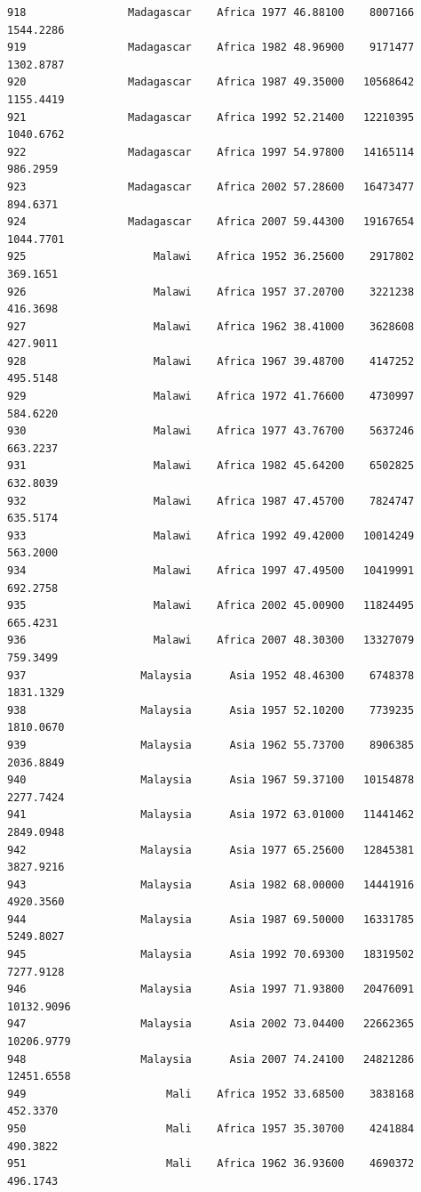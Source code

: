 \documentclass[
  letterpaper,
  DIV=11,
  numbers=noendperiod]{scrreprt}
\begin{document}
\begin{verbatim}
918                Madagascar    Africa 1977 46.88100    8007166   1544.2286
919                Madagascar    Africa 1982 48.96900    9171477   1302.8787
920                Madagascar    Africa 1987 49.35000   10568642   1155.4419
921                Madagascar    Africa 1992 52.21400   12210395   1040.6762
922                Madagascar    Africa 1997 54.97800   14165114    986.2959
923                Madagascar    Africa 2002 57.28600   16473477    894.6371
924                Madagascar    Africa 2007 59.44300   19167654   1044.7701
925                    Malawi    Africa 1952 36.25600    2917802    369.1651
926                    Malawi    Africa 1957 37.20700    3221238    416.3698
927                    Malawi    Africa 1962 38.41000    3628608    427.9011
928                    Malawi    Africa 1967 39.48700    4147252    495.5148
929                    Malawi    Africa 1972 41.76600    4730997    584.6220
930                    Malawi    Africa 1977 43.76700    5637246    663.2237
931                    Malawi    Africa 1982 45.64200    6502825    632.8039
932                    Malawi    Africa 1987 47.45700    7824747    635.5174
933                    Malawi    Africa 1992 49.42000   10014249    563.2000
934                    Malawi    Africa 1997 47.49500   10419991    692.2758
935                    Malawi    Africa 2002 45.00900   11824495    665.4231
936                    Malawi    Africa 2007 48.30300   13327079    759.3499
937                  Malaysia      Asia 1952 48.46300    6748378   1831.1329
938                  Malaysia      Asia 1957 52.10200    7739235   1810.0670
939                  Malaysia      Asia 1962 55.73700    8906385   2036.8849
940                  Malaysia      Asia 1967 59.37100   10154878   2277.7424
941                  Malaysia      Asia 1972 63.01000   11441462   2849.0948
942                  Malaysia      Asia 1977 65.25600   12845381   3827.9216
943                  Malaysia      Asia 1982 68.00000   14441916   4920.3560
944                  Malaysia      Asia 1987 69.50000   16331785   5249.8027
945                  Malaysia      Asia 1992 70.69300   18319502   7277.9128
946                  Malaysia      Asia 1997 71.93800   20476091  10132.9096
947                  Malaysia      Asia 2002 73.04400   22662365  10206.9779
948                  Malaysia      Asia 2007 74.24100   24821286  12451.6558
949                      Mali    Africa 1952 33.68500    3838168    452.3370
950                      Mali    Africa 1957 35.30700    4241884    490.3822
951                      Mali    Africa 1962 36.93600    4690372    496.1743

\end{verbatim}
\end{document}
